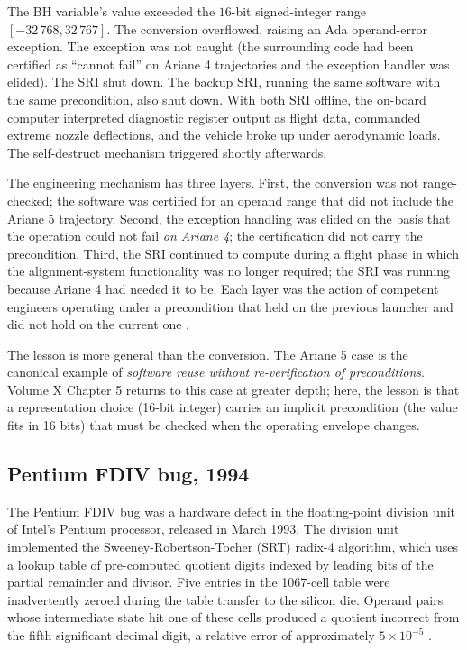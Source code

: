 The BH variable's value exceeded the $16$-bit signed-integer range $[-32\,768, 32\,767]$. The conversion overflowed, raising an Ada operand-error exception. The exception was not caught (the surrounding code had been certified as ``cannot fail'' on Ariane 4 trajectories and the exception handler was elided). The SRI shut down. The backup SRI, running the same software with the same precondition, also shut down. With both SRI offline, the on-board computer interpreted diagnostic register output as flight data, commanded extreme nozzle deflections, and the vehicle broke up under aerodynamic loads. The self-destruct mechanism triggered shortly afterwards.

The engineering mechanism has three layers. First, the conversion was not range-checked; the software was certified for an operand range that did not include the Ariane 5 trajectory. Second, the exception handling was elided on the basis that the operation could not fail \emph{on Ariane 4}; the certification did not carry the precondition. Third, the SRI continued to compute during a flight phase in which the alignment-system functionality was no longer required; the SRI was running because Ariane 4 had needed it to be. Each layer was the action of competent engineers operating under a precondition that held on the previous launcher and did not hold on the current one \cite{acc:ariane501-ifr}.

The lesson is more general than the conversion. The Ariane 5 case is the canonical example of \emph{software reuse without re-verification of preconditions}. Volume X Chapter 5 returns to this case at greater depth; here, the lesson is that a representation choice (16-bit integer) carries an implicit precondition (the value fits in 16 bits) that must be checked when the operating envelope changes.

\subsection{Pentium FDIV bug, 1994}

The Pentium FDIV bug was a hardware defect in the floating-point division unit of Intel's Pentium processor, released in March 1993. The division unit implemented the Sweeney-Robertson-Tocher (SRT) radix-4 algorithm, which uses a lookup table of pre-computed quotient digits indexed by leading bits of the partial remainder and divisor. Five entries in the 1067-cell table were inadvertently zeroed during the table transfer to the silicon die. Operand pairs whose intermediate state hit one of these cells produced a quotient incorrect from the fifth significant decimal digit, a relative error of approximately $5 \times 10^{-5}$ \cite{paper:coe-tang-pratt-1995}.

